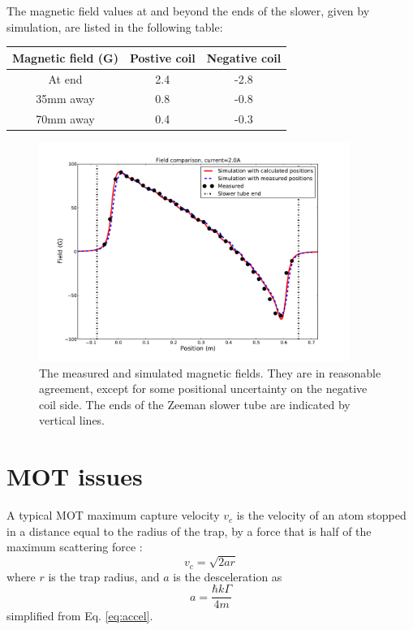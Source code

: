 \documentclass[12pt,a4paper]{article}
\begin{document}
The magnetic field values at and beyond the ends of the slower, given by simulation, are listed in the following table:

\begin{center}
\begin{tabular}{|c|c|c|}
\hline
Magnetic field (G) & Postive coil & Negative coil \\
\hline
At end & 2.4 & -2.8 \\
\hline
35mm away & 0.8 & -0.8 \\
\hline
70mm away & 0.4 & -0.3 \\
\hline
\end{tabular}
\end{center}

\begin{figure}[htb]
\centering
\includegraphics[width=0.9\textwidth]{slowerfield3}
\caption{The measured and simulated magnetic fields. They are in reasonable agreement, except for some positional uncertainty on the negative coil side. The ends of the Zeeman slower tube are indicated by vertical lines.}
\label{fig:slowerfield}
\end{figure}

\section{MOT issues}

A typical MOT maximum capture velocity $v_{c}$ is the velocity of an atom stopped in a distance equal to the radius of the trap, by a force that is half of the maximum scattering force \cite{Steane1992}:
\begin{equation}
v_c = \sqrt{2 a r}
\end{equation}
where $r$ is the trap radius, and $a$ is the desceleration as
\begin{equation}
a = \frac{\hbar k \Gamma}{4 m}
\end{equation}
simplified from Eq. \ref{eq:accel}.
\end{document}

